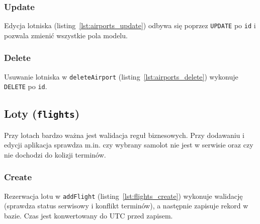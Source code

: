 \documentclass[fleqn,onecolumn,a4paper,12pt,titlepage]{article}
\begin{document}


\subsubsection{Update}

Edycja lotniska (listing~\ref{lst:airports_update}) odbywa się poprzez \texttt{UPDATE} po \texttt{id} i pozwala zmienić wszystkie pola modelu.



\subsubsection{Delete}

Usuwanie lotniska w \texttt{deleteAirport} (listing~\ref{lst:airports_delete}) wykonuje \texttt{DELETE} po \texttt{id}.



\subsection{Loty (\texttt{flights})}

Przy lotach bardzo ważna jest walidacja reguł biznesowych. Przy dodawaniu i edycji aplikacja sprawdza m.in. czy wybrany samolot nie jest w serwisie oraz czy nie dochodzi do kolizji terminów.

\subsubsection{Create}

Rezerwacja lotu w \texttt{addFlight} (listing~\ref{lst:flights_create}) wykonuje walidację (sprawdza status serwisowy i konflikt terminów), a następnie zapisuje rekord w bazie. Czas jest konwertowany do UTC przed zapisem.


\end{document}
